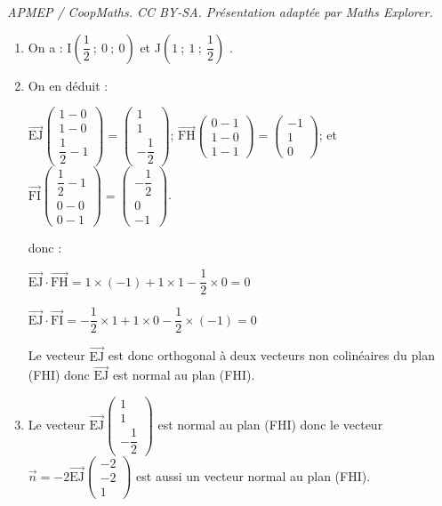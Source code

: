 \documentclass[10pt]{article}
\providecommand{\vect}[1]{\overrightarrow{#1}}
\begin{document}
\noindent\textit{APMEP / CoopMaths. CC BY-SA. Présentation adaptée par Maths Explorer.}\par\medskip
\medskip


\begin{enumerate}
	\item

	On a : I$\left(\dfrac{1}{2}~;~ 0~;~0 \right)$  et J$\left(1~;~1~;~\dfrac{1}{2} \right)$ .

	\item

	On en déduit :

	$\vect{\text{EJ}} \begin{pmatrix}1-0  \\ 1- 0 \\ \dfrac{1}{2}-1     \end{pmatrix} =  \begin{pmatrix}1 \\ 1 \\ -\dfrac{1}{2}\end{pmatrix}$;
	\qquad
	$\vect{\text{FH}} \begin{pmatrix}0-1   \\ 1-0 \\ 1- 1   \end{pmatrix} =  \begin{pmatrix}-1 \\ 1 \\ 0\end{pmatrix}$;
	\quad	et \quad $\vect{\text{FI}} \begin{pmatrix}\dfrac{1}{2}-1  \\ 0-0  \\ 0-1   \end{pmatrix} =  \begin{pmatrix}-\dfrac{1}{2} \\ 0 \\ -1    \end{pmatrix}$.


	donc :

	$\vect{\text{EJ}} \cdot \vect{\text{FH}}= 1 \times (-1) + 1\times 1 -\dfrac{1}{2} \times 0 = 0$

	$\vect{\text{EJ}} \cdot \vect{\text{FI}}=  -\dfrac{1}{2} \times 1 + 1\times 0 -\dfrac{1}{2} \times (-1) = 0$

	Le vecteur $\vect{\text{EJ}}$ est donc orthogonal à deux vecteurs non colinéaires du plan (FHI) donc $\vect{\text{EJ}}$ est normal au plan (FHI).

	\item Le vecteur $\vect{\text{EJ}}\begin{pmatrix}1 \\ 1 \\ -\dfrac{1}{2}    \end{pmatrix}$ est normal au plan (FHI) donc le vecteur   $\vect{n}= -2\vect{\text{EJ}}\begin{pmatrix}-2 \\ -2 \\ 1    \end{pmatrix}$ est aussi un vecteur normal au plan (FHI).


\end{enumerate}
\end{document}
